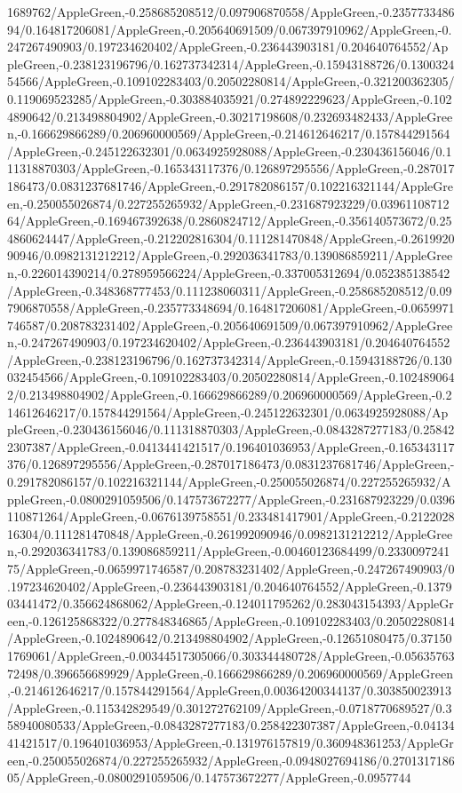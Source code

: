 {\begin{tikzternal}
{1689762/AppleGreen,-0.258685208512/0.097906870558/AppleGreen,-0.235773348694/0.164817206081/AppleGreen,-0.205640691509/0.067397910962/AppleGreen,-0.247267490903/0.197234620402/AppleGreen,-0.236443903181/0.204640764552/AppleGreen,-0.238123196796/0.162737342314/AppleGreen,-0.15943188726/0.130032454566/AppleGreen,-0.109102283403/0.20502280814/AppleGreen,-0.321200362305/0.119069523285/AppleGreen,-0.303884035921/0.274892229623/AppleGreen,-0.1024890642/0.213498804902/AppleGreen,-0.30217198608/0.232693482433/AppleGreen,-0.166629866289/0.206960000569/AppleGreen,-0.214612646217/0.157844291564/AppleGreen,-0.245122632301/0.0634925928088/AppleGreen,-0.230436156046/0.111318870303/AppleGreen,-0.165343117376/0.126897295556/AppleGreen,-0.287017186473/0.0831237681746/AppleGreen,-0.291782086157/0.102216321144/AppleGreen,-0.250055026874/0.227255265932/AppleGreen,-0.231687923229/0.0396110871264/AppleGreen,-0.169467392638/0.2860824712/AppleGreen,-0.356140573672/0.254860624447/AppleGreen,-0.212202816304/0.111281470848/AppleGreen,-0.261992090946/0.0982131212212/AppleGreen,-0.292036341783/0.139086859211/AppleGreen,-0.226014390214/0.278959566224/AppleGreen,-0.337005312694/0.052385138542/AppleGreen,-0.348368777453/0.111238060311/AppleGreen,-0.258685208512/0.097906870558/AppleGreen,-0.235773348694/0.164817206081/AppleGreen,-0.0659971746587/0.208783231402/AppleGreen,-0.205640691509/0.067397910962/AppleGreen,-0.247267490903/0.197234620402/AppleGreen,-0.236443903181/0.204640764552/AppleGreen,-0.238123196796/0.162737342314/AppleGreen,-0.15943188726/0.130032454566/AppleGreen,-0.109102283403/0.20502280814/AppleGreen,-0.1024890642/0.213498804902/AppleGreen,-0.166629866289/0.206960000569/AppleGreen,-0.214612646217/0.157844291564/AppleGreen,-0.245122632301/0.0634925928088/AppleGreen,-0.230436156046/0.111318870303/AppleGreen,-0.0843287277183/0.258422307387/AppleGreen,-0.0413441421517/0.196401036953/AppleGreen,-0.165343117376/0.126897295556/AppleGreen,-0.287017186473/0.0831237681746/AppleGreen,-0.291782086157/0.102216321144/AppleGreen,-0.250055026874/0.227255265932/AppleGreen,-0.0800291059506/0.147573672277/AppleGreen,-0.231687923229/0.0396110871264/AppleGreen,-0.0676139758551/0.233481417901/AppleGreen,-0.212202816304/0.111281470848/AppleGreen,-0.261992090946/0.0982131212212/AppleGreen,-0.292036341783/0.139086859211/AppleGreen,-0.00460123684499/0.233009724175/AppleGreen,-0.0659971746587/0.208783231402/AppleGreen,-0.247267490903/0.197234620402/AppleGreen,-0.236443903181/0.204640764552/AppleGreen,-0.137903441472/0.356624868062/AppleGreen,-0.124011795262/0.283043154393/AppleGreen,-0.126125868322/0.277848346865/AppleGreen,-0.109102283403/0.20502280814/AppleGreen,-0.1024890642/0.213498804902/AppleGreen,-0.12651080475/0.371501769061/AppleGreen,-0.00344517305066/0.303344480728/AppleGreen,-0.0563576372498/0.396656689929/AppleGreen,-0.166629866289/0.206960000569/AppleGreen,-0.214612646217/0.157844291564/AppleGreen,0.00364200344137/0.303850023913/AppleGreen,-0.115342829549/0.301272762109/AppleGreen,-0.0718770689527/0.358940080533/AppleGreen,-0.0843287277183/0.258422307387/AppleGreen,-0.0413441421517/0.196401036953/AppleGreen,-0.131976157819/0.360948361253/AppleGreen,-0.250055026874/0.227255265932/AppleGreen,-0.0948027694186/0.270131718605/AppleGreen,-0.0800291059506/0.147573672277/AppleGreen,-0.0957744}
\end{tikzternal}}
